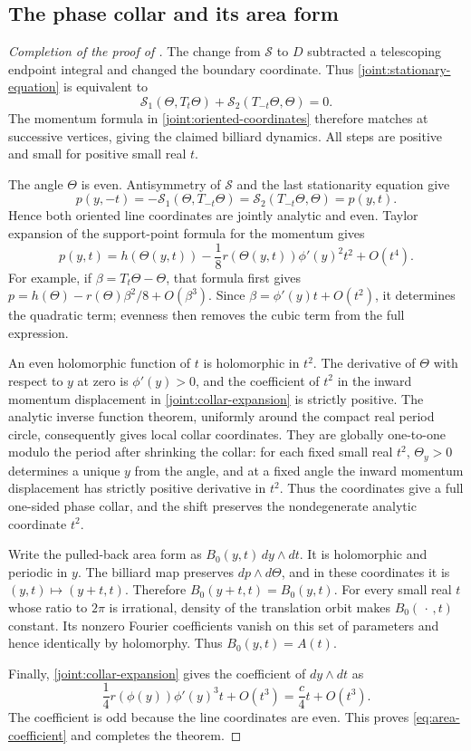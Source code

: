 \subsection{The phase collar and its area form}

\begin{proof}[Completion of the proof of ]
The change from \(\mathcal S\) to \(D\) subtracted a telescoping
endpoint integral and changed the boundary coordinate. Thus
\eqref{joint:stationary-equation} is equivalent to
\[
 \mathcal S_1(\Theta,T_t\Theta)
       +\mathcal S_2(T_{-t}\Theta,\Theta)=0.
\]
The momentum formula in \eqref{joint:oriented-coordinates} therefore
matches at successive vertices, giving the claimed billiard dynamics.
All steps are positive and small for positive small real \(t\).

The angle \(\Theta\) is even. Antisymmetry of \(\mathcal S\) and the
last stationarity equation give
\[
 p(y,-t)=-\mathcal S_1(\Theta,T_{-t}\Theta)
       =\mathcal S_2(T_{-t}\Theta,\Theta)=p(y,t).
\]
Hence both oriented line coordinates are jointly analytic and even.
Taylor expansion of the support-point formula for the momentum gives
\begin{equation}
 p(y,t)=h(\Theta(y,t))
        -\frac18 r(\Theta(y,t))\phi'(y)^2t^2+O(t^4).
 \label{joint:collar-expansion}
\end{equation}
For example, if \(\beta=T_t\Theta-\Theta\), that formula first gives
\(p=h(\Theta)-r(\Theta)\beta^2/8+O(\beta^3)\). Since
\(\beta=\phi'(y)t+O(t^2)\), it determines the quadratic term;
evenness then removes the cubic term from the full expression.

An even holomorphic function of \(t\) is holomorphic in \(t^2\).
The derivative of \(\Theta\) with respect to \(y\) at zero is
\(\phi'(y)>0\), and the coefficient of \(t^2\) in the inward momentum
displacement in \eqref{joint:collar-expansion} is strictly positive.
The analytic inverse function theorem, uniformly around the compact
real period circle, consequently gives local collar coordinates.
They are globally one-to-one modulo the period after shrinking the
collar: for each fixed small real \(t^2\), \(\Theta_y>0\) determines a
unique \(y\) from the angle, and at a fixed angle the inward momentum
displacement has strictly positive derivative in \(t^2\).
Thus the coordinates give a full one-sided phase collar, and the shift preserves the
nondegenerate analytic coordinate \(t^2\).

Write the pulled-back area form as
\(B_0(y,t)\,dy\wedge dt\). It is holomorphic and periodic in \(y\).
The billiard map preserves \(dp\wedge d\Theta\), and in these
coordinates it is \((y,t)\mapsto(y+t,t)\). Therefore
\(B_0(y+t,t)=B_0(y,t)\). For every small real \(t\) whose ratio to
\(2\pi\) is irrational, density of the translation orbit makes
\(B_0(\,\cdot\,,t)\) constant. Its nonzero Fourier coefficients
vanish on this set of parameters and hence identically by holomorphy.
Thus \(B_0(y,t)=A(t)\).

Finally, \eqref{joint:collar-expansion} gives the coefficient of
\(dy\wedge dt\) as
\[
 \frac14 r(\phi(y))\phi'(y)^3t+O(t^3)
       =\frac{c}{4}t+O(t^3).
\]
The coefficient is odd because the line coordinates are even. This
proves \eqref{eq:area-coefficient} and completes the theorem.
\end{proof}
